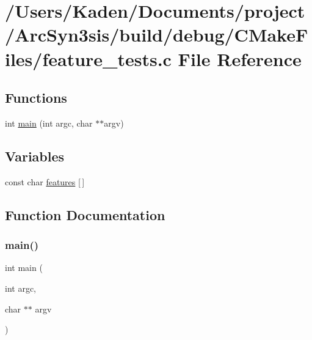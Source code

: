 \hypertarget{a00807}{}\section{/\+Users/\+Kaden/\+Documents/project/\+Arc\+Syn3sis/build/debug/\+C\+Make\+Files/feature\+\_\+tests.c File Reference}
\label{a00807}
\subsection*{Functions}
\begin{DoxyCompactItemize}
\item 
int \hyperlink{a00807_a3c04138a5bfe5d72780bb7e82a18e627}{main} (int argc, char $\ast$$\ast$argv)
\end{DoxyCompactItemize}
\subsection*{Variables}
\begin{DoxyCompactItemize}
\item 
const char \hyperlink{a00807_a1582568e32f689337602a16bf8a5bff0}{features} \mbox{[}$\,$\mbox{]}
\end{DoxyCompactItemize}


\subsection{Function Documentation}
\mbox{\label{a00807_a3c04138a5bfe5d72780bb7e82a18e627}} 
\subsubsection{\texorpdfstring{main()}{main()}}
{\footnotesize\ttfamily int main (\begin{DoxyParamCaption}\item[{int}]{argc,  }\item[{char $\ast$$\ast$}]{argv }\end{DoxyParamCaption})}



